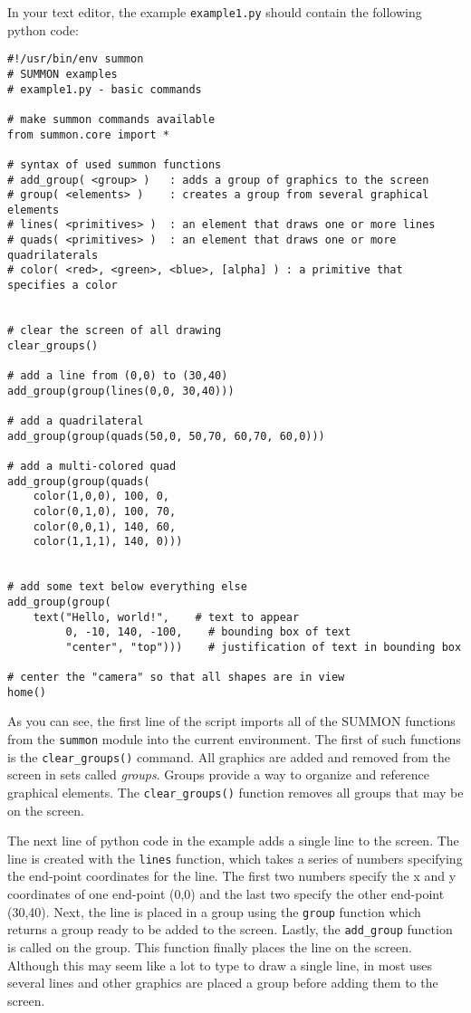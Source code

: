 \documentclass[12pt]{article}
\newcommand{\code}[1]{{\tt #1}}
\begin{document}
In your text editor, the example \code{example1.py} should contain the 
following python code:

\begin{minipage}{6in}
{ \footnotesize
\begin{verbatim}
#!/usr/bin/env summon
# SUMMON examples
# example1.py - basic commands

# make summon commands available
from summon.core import *

# syntax of used summon functions
# add_group( <group> )   : adds a group of graphics to the screen
# group( <elements> )    : creates a group from several graphical elements
# lines( <primitives> )  : an element that draws one or more lines
# quads( <primitives> )  : an element that draws one or more quadrilaterals
# color( <red>, <green>, <blue>, [alpha] ) : a primitive that specifies a color


# clear the screen of all drawing
clear_groups()

# add a line from (0,0) to (30,40)
add_group(group(lines(0,0, 30,40)))

# add a quadrilateral
add_group(group(quads(50,0, 50,70, 60,70, 60,0)))

# add a multi-colored quad
add_group(group(quads(
    color(1,0,0), 100, 0,
    color(0,1,0), 100, 70,
    color(0,0,1), 140, 60,
    color(1,1,1), 140, 0)))


# add some text below everything else
add_group(group(
    text("Hello, world!",    # text to appear
         0, -10, 140, -100,    # bounding box of text
         "center", "top")))    # justification of text in bounding box

# center the "camera" so that all shapes are in view
home()
\end{verbatim}
}
\end{minipage}
\vspace{.25in}


As you can see, the first line of the script imports all of the SUMMON functions
from the \code{summon} module into the current environment.  The first of such
functions is the \code{clear\_groups()} command.  All graphics are added and
removed from the screen in sets called {\em groups}.  Groups provide a way to
organize and reference graphical elements.  The \code{clear\_groups()} function
removes all groups that may be on the screen.

The next line of python code in the example adds a single line to the screen. 
The line is created with the \code{lines} function, which takes a series of
numbers specifying the end-point coordinates for the line.  The first
two numbers specify the x and y coordinates of one end-point (0,0) and the last
two specify the other end-point (30,40).  Next, the line is placed in a group
using the \code{group} function which returns a group ready to be added to the
screen.   Lastly, the \code{add\_group} function is called on the group.  This
function finally places the line on the screen.  Although this may seem like a
lot to type to draw a single line, in most uses several lines and other graphics 
are placed a group before adding them to the screen.
\end{document}
